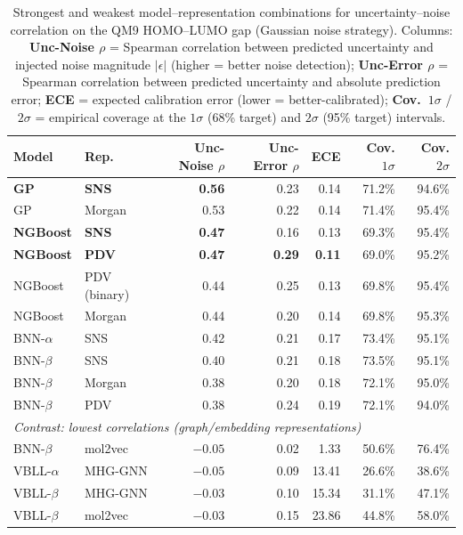 \begin{table}[htbp]
\centering
\caption{Strongest and weakest model--representation combinations for uncertainty--noise correlation on the QM9 HOMO--LUMO gap (Gaussian noise strategy). Columns: \textbf{Unc-Noise $\rho$} = Spearman correlation between predicted uncertainty and injected noise magnitude $|\epsilon|$ (higher = better noise detection); \textbf{Unc-Error $\rho$} = Spearman correlation between predicted uncertainty and absolute prediction error; \textbf{ECE} = expected calibration error (lower = better-calibrated); \textbf{Cov.\ $1\sigma$} / \textbf{$2\sigma$} = empirical coverage at the $1\sigma$ (68\% target) and $2\sigma$ (95\% target) intervals.}
\label{tab:top_unc_noise}
\small
\begin{tabular}{llrrrrr}
\toprule
\textbf{Model} & \textbf{Rep.} & \textbf{Unc-Noise $\rho$} & \textbf{Unc-Error $\rho$} & \textbf{ECE} & \textbf{Cov. $1\sigma$} & \textbf{Cov. $2\sigma$} \\
\midrule
\textbf{GP}    & \textbf{SNS}    & \textbf{0.56} & 0.23 & 0.14 & 71.2\% & 94.6\% \\
GP             & Morgan          & 0.53 & 0.22 & 0.14 & 71.4\% & 95.4\% \\
\textbf{NGBoost} & \textbf{SNS}  & \textbf{0.47} & 0.16 & 0.13 & 69.3\% & 95.4\% \\
\textbf{NGBoost} & \textbf{PDV}  & \textbf{0.47} & \textbf{0.29} & \textbf{0.11} & 69.0\% & 95.2\% \\
NGBoost        & PDV (binary)    & 0.44 & 0.25 & 0.13 & 69.8\% & 95.4\% \\
NGBoost        & Morgan          & 0.44 & 0.20 & 0.14 & 69.8\% & 95.3\% \\
BNN-$\alpha$   & SNS             & 0.42 & 0.21 & 0.17 & 73.4\% & 95.1\% \\
BNN-$\beta$    & SNS             & 0.40 & 0.21 & 0.18 & 73.5\% & 95.1\% \\
BNN-$\beta$    & Morgan          & 0.38 & 0.20 & 0.18 & 72.1\% & 95.0\% \\
BNN-$\beta$    & PDV             & 0.38 & 0.24 & 0.19 & 72.1\% & 94.0\% \\
\midrule
\multicolumn{7}{l}{\textit{Contrast: lowest correlations (graph/embedding representations)}} \\
\midrule
BNN-$\beta$ & mol2vec & $-0.05$ & 0.02 & 1.33 & 50.6\% & 76.4\% \\
VBLL-$\alpha$ & MHG-GNN & $-0.05$ & 0.09 & 13.41 & 26.6\% & 38.6\% \\
VBLL-$\beta$ & MHG-GNN & $-0.03$ & 0.10 & 15.34 & 31.1\% & 47.1\% \\
VBLL-$\beta$ & mol2vec & $-0.03$ & 0.15 & 23.86 & 44.8\% & 58.0\% \\
\bottomrule
\end{tabular}
\end{table}


